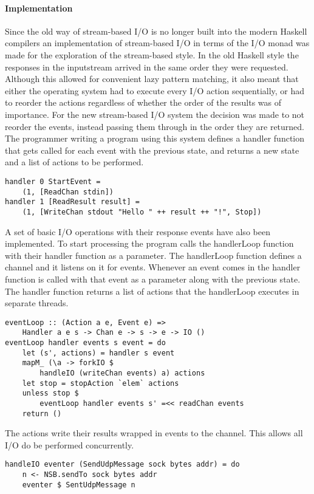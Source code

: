\paragraph{Implementation}
Since the old way of stream-based I/O is no longer built into the modern Haskell compilers an implementation of stream-based I/O in terms of the I/O monad was made for the exploration of the stream-based style.
In the old Haskell style the responses in the inputstream arrived in the same order they were requested. Although this allowed for convenient lazy pattern matching, it also meant that either the operating system had to execute every I/O action sequentially, or had to reorder the actions regardless of whether the order of the results was of importance. For the new stream-based I/O system the decision was made to not reorder the events, instead passing them through in the order they are returned.
The programmer writing a program using this system defines a handler function that gets called for each event with the previous state, and returns a new state and a list of actions to be performed.
\begin{lstlisting}[caption={Stream-based example}]
handler 0 StartEvent =
    (1, [ReadChan stdin])
handler 1 [ReadResult result] =
    (1, [WriteChan stdout "Hello " ++ result ++ "!", Stop])
\end{lstlisting}
A set of basic I/O operations with their response events have also been implemented.
To start processing the program calls the handlerLoop function with their handler function as a parameter.
The handlerLoop function defines a channel and it listens on it for events. Whenever an event comes in the handler function is called with that event as a parameter along with the previous state. The handler function returns a list of actions that the handlerLoop executes in separate threads. 
\begin{lstlisting}[caption={The eventLoop}]
eventLoop :: (Action a e, Event e) =>
    Handler a e s -> Chan e -> s -> e -> IO ()
eventLoop handler events s event = do
    let (s', actions) = handler s event
    mapM_ (\a -> forkIO $
        handleIO (writeChan events) a) actions
    let stop = stopAction `elem` actions
    unless stop $
        eventLoop handler events s' =<< readChan events
    return ()
\end{lstlisting}
The actions write their results wrapped in events to the channel. This allows all I/O do be performed concurrently.
\begin{lstlisting}[caption={Example of an Action, SendUdpMessage}]
handleIO eventer (SendUdpMessage sock bytes addr) = do
    n <- NSB.sendTo sock bytes addr
    eventer $ SentUdpMessage n
\end{lstlisting}
